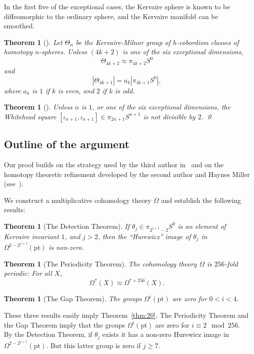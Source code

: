 \documentclass{amsart}
\newtheorem{thm}[equation]{Theorem}
\theoremstyle{definition}
\theoremstyle{remark}
\newcommand{\magic}{\Omega}
\begin{document}
In the first five of the exceptional cases, the Kervaire sphere is
known to be diffeomorphic to the ordinary sphere, and the Kervaire
manifold can be smoothed.

\begin{thm}[\cite{kervaire63:_group,MR802786}] 
Let $\Theta_{n}$ be the Kervaire-Milnor group of $h$-cobordism classes
of homotopy $n$-spheres.  Unless $(4k+2)$ is one of the six
exceptional dimensions, 
\[
\Theta_{4k+2} \approx \pi_{4k+2}S^{0} 
\]
and 
\[
\left|\Theta_{4k+1}\right| = a_{k}\left|\pi_{4k+1}S^{0}\right|,
\]
where $a_{k}$ is $1$ if $k$ is even, and $2$ if $k$ is odd.
\end{thm}

\begin{thm}[\cite{BJM3}]
Unless $n$ is $1$, or one of the six exceptional dimensions, the
Whitehead square $[\iota_{n+1},\iota_{n+1}]\in \pi_{2n+1}S^{n+1}$ is not
divisible by $2$.  \qed
\end{thm}

\subsection{Outline of the argument} Our proof builds on the
strategy used by the third author in~\cite{Rav:Arf} and on the
homotopy theoretic refinement developed by the second author and
Haynes Miller (see~\cite{MR1642902}).  

We construct a multiplicative cohomology theory $\magic$ and establish
the following results:
\begin{thm} [The Detection Theorem]\label{thm:25}
If $\theta_{j}\in\pi_{2^{j+1}-2}S^{0}$ is an element of Kervaire
invariant $1$, and $j>2$, then the ``Hurewicz'' image of $\theta_{j}$ in
$\Omega^{2-2^{j+1}}(\text{pt})$ is non-zero.
\end{thm}

\begin{thm}[The Periodicity Theorem]
\label{thm:39}
The cohomology theory $\magic$ is $256$-fold periodic: 
For all $X$, 
\[
\magic^{\ast}(X) \approx \magic^{\ast+256}(X).
\]
\end{thm}

\begin{thm}[The Gap Theorem]
\label{thm:42}
The groups $\magic^{i}(\text{pt})$ are zero for $0<i<4$.
\end{thm}

These three results easily imply Theorem~\ref{thm:20}.  The
Periodicity Theorem and the Gap Theorem imply that the groups
$\magic^{i}(\text{pt})$ are zero for $i\equiv 2\mod 256$.  By the Detection
Theorem, if $\theta_{j}$ exists it has a non-zero Hurewicz image in
$\magic^{2-2^{j+1}}(\text{pt})$.  But this latter group is zero if
$j\ge 7$.
\end{document}
